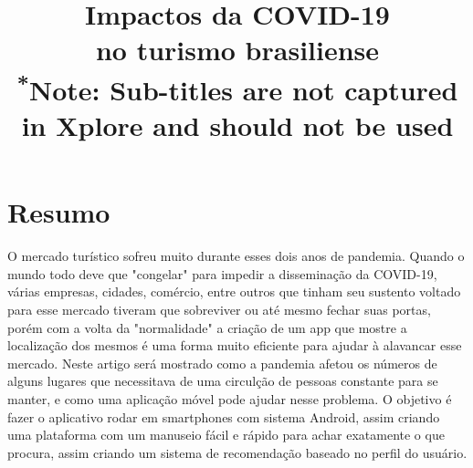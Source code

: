 \documentclass[conference]{IEEEtran}
\begin{document}
\title{Impactos da COVID-19 \\ no turismo brasiliense\\
{\footnotesize \textsuperscript{*}Note: Sub-titles are not captured in Xplore and
should not be used}
}

\author{
\and
{}
\and
{}
\and
{}
}

\maketitle

\section{Resumo}
O mercado turístico sofreu muito durante esses dois anos de pandemia. Quando o mundo todo deve que "congelar" para impedir a disseminação da COVID-19, várias empresas, cidades, comércio, entre outros que tinham seu sustento voltado para esse mercado tiveram que sobreviver ou até mesmo fechar suas portas, porém com a volta da "normalidade" a criação de um app que mostre a localização dos mesmos é uma forma muito eficiente para ajudar à alavancar esse mercado. Neste artigo será mostrado como a pandemia afetou os números de alguns lugares que necessitava de uma circulção de pessoas constante para se manter, e como uma aplicação móvel pode ajudar nesse problema. O objetivo é fazer o aplicativo rodar em smartphones com sistema Android, assim criando uma plataforma com um manuseio fácil e rápido para achar exatamente o que procura, assim criando um sistema de recomendação baseado no perfil do usuário. 
\end{document}
